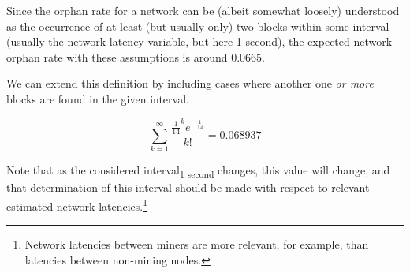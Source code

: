 \documentclass[11pt]{article}
\theoremstyle{plain}
\newcommand{\comment}[1]{}
\begin{document}
{Since the orphan rate for a network can be (albeit somewhat loosely)
understood as the occurrence of at least (but usually only) two blocks
within some interval (usually the network latency variable, but here 1 second),
the expected network orphan rate with these assumptions is around $0.0665$.

We can extend this definition by including cases where another one \emph{or more} blocks
are found in the given interval.

\begin{equation}
    \sum_{k=1}^{\infty}\frac{\frac{1}{14}^{k}e^{-\frac{1}{14}}}{k!} = 0.068937
\end{equation}

Note that as the considered interval\textsubscript{1 second} changes, this value will change,
and that determination of this interval should be made
with respect to relevant estimated network latencies.\footnote{
Network latencies between miners are more relevant, for example,
than latencies between non-mining nodes.
}

\comment{
Given our assumption of the Poisson Distribution fit for network block intervals,
we can set Poisson's $k$ value to 2, representing the occurrence of 2 blocks.
Using the Poisson Probability Mass Function, we see that given an average block
interval of $1/14$ seconds, the probability of seeing $k=2$ blocks in some
interval $t=1$ seconds
($\lambda=\mathrm{rate}*\mathrm{interval}=1*\frac{1}{14}$) is:

\begin{equation}
  \frac{\frac{1}{14}^{2}e^{-\frac{1}{14}}}{2!} = 0.00237516...
\end{equation}

But we must extend this to represent the probability of seeing $2$ \emph{or
more} blocks.
We approximate a generalization, using $99$ as an arbitrary upper limit for the
considered number of potential blocks\footnote{The number of potential blocks
is the number of miners on the network.} occurring in the interval:

\begin{equation}
  \sum_{k=2}^{99}\frac{\frac{1}{14}^{k}e^{-\frac{1}{14}}}{k!} = 0.002432736...
\end{equation}


\begin{equation}
    \sum_{k=1}^{1}\frac{\frac{1}{14}^{k}e^{-\frac{1}{14}}}{k!} = 0.0665044842...
\end{equation}

}}
\end{document}
